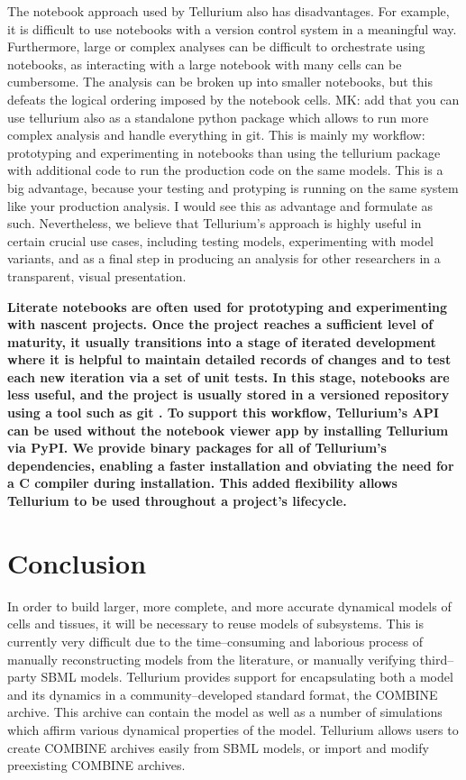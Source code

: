 \documentclass[10pt,letterpaper]{article}
\begin{document}
The notebook approach used by Tellurium also has disadvantages. For example, it is difficult to use notebooks with a version control system in a meaningful way. Furthermore, large or complex analyses can be difficult to orchestrate using notebooks, as interacting with a large notebook with many cells can be cumbersome. The analysis can be broken up into smaller notebooks, but this defeats the logical ordering imposed by the notebook cells.
{\color{orange} MK: add that you can use tellurium also as a standalone python package which allows to run more complex analysis and handle everything in git. This is mainly my workflow: prototyping and experimenting in notebooks than using the tellurium package with additional code to run the production code on the same models. This is a big advantage, because your testing and protyping is running on the same system like your production analysis. I would see this as advantage and formulate as such.}
Nevertheless, we believe that Tellurium's approach is highly useful in certain crucial use cases, including testing models, experimenting with model variants, and as a final step in producing an analysis for other researchers in a transparent, visual presentation.

\textbf{ Literate notebooks are often used for prototyping and experimenting with nascent projects. Once the project reaches a sufficient level of maturity, it usually transitions into a stage of iterated development where it is helpful to maintain detailed records of changes and to test each new iteration via a set of unit tests. In this stage, notebooks are less useful, and the project is usually stored in a versioned repository using a tool such as git \cite{gitscm}. To support this workflow, Tellurium's API can be used without the notebook viewer app by installing Tellurium via PyPI. We provide binary packages for all of Tellurium's dependencies, enabling a faster installation and obviating the need for a C compiler during installation. This added flexibility allows Tellurium to be used throughout a project's lifecycle. }

\section*{Conclusion}

In order to build larger, more complete, and more accurate dynamical models of cells and tissues, it will be necessary to reuse models of subsystems. This is currently very difficult due to the time--consuming and laborious process of manually reconstructing models from the literature, or manually verifying third--party SBML models. Tellurium provides support for encapsulating both a model and its dynamics in a community--developed standard format, the COMBINE archive. This archive can contain the model as well as a number of simulations which affirm various dynamical properties of the model. Tellurium allows users to create COMBINE archives easily from SBML models, or import and modify preexisting COMBINE archives.
\end{document}
